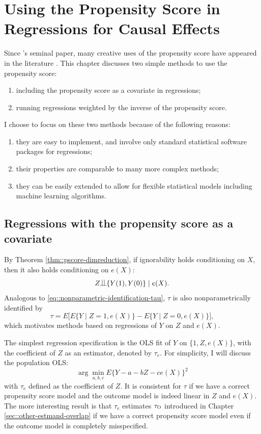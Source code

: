 
\chapter{Using the Propensity Score in Regressions for Causal Effects}\label{chapter::pscore-unification}
 

Since \citet{rosenbaum1983central}'s seminal paper, many creative uses of the propensity score have appeared in the literature \citep[e.g.,][]{bang2005doubly, robins2007comment, van2011targeted, vansteelandt2014regression}. This chapter discusses two simple methods to use the propensity score: 
\begin{enumerate}
\item
including the propensity score as a covariate in regressions;
\item
running regressions weighted by the inverse of the propensity score. 
\end{enumerate}
I choose to  focus on these two methods because of the following reasons: 
\begin{enumerate}
\item
they are easy to implement, and involve only standard statistical software packages for regressions;
\item
their properties are comparable to many more complex methods;
\item
they can be easily extended to allow for flexible statistical models including machine learning algorithms.
\end{enumerate}

 
\section{Regressions with the propensity score as a covariate}
\label{sec::regress-on-pscore}

By Theorem \ref{thm::pscore-dimreduction}, if ignorability holds conditioning on $X$, then it also holds conditioning on $e(X)$: 
$$
Z\ind \{ Y(1) , Y(0)\} \mid e(X). 
$$ 
Analogous to \eqref{eq::nonparametric-identification-tau}, $\tau$ is also nonparametrically identified by
$$
\tau = E\Big[   E\{ Y\mid Z=1, e(X) \} - E\{ Y\mid Z=0, e(X) \} \Big] ,
$$
which motivates methods based on regressions of $Y$ on $Z$ and $e(X)$. 



The simplest regression specification is the OLS fit of $Y$ on $\{1, Z, e(X)\}$, with the coefficient of $Z$ as an estimator, denoted by $\tau_{e}$. For simplicity, I will discuss the population OLS:
$$
\arg\min_{a,b,c}  E\{ Y - a - bZ - c  e(X)  \}^2
$$
with $\tau_{e}$ defined as the coefficient of $Z$.
It is consistent for $\tau$ if we have a correct propensity score model and the outcome model is indeed linear in $Z$ and $e(X)$. The more interesting result is that $\tau_{e}$ estimates $\tau_\textsc{O}$ introduced in Chapter \ref{sec::other-estmand-overlap} if we have a correct propensity score model even if the outcome model is completely misspecified. 

